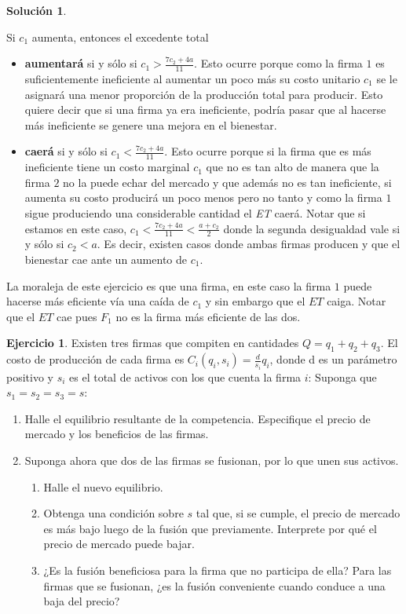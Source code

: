 \documentclass[a4paper, 11pt]{article}
\theoremstyle{definition}
\newtheorem{ejercicio}{Ejercicio}
\newtheorem{solucion}{Soluci\'on}
\begin{document}
\begin{solucion}
\begin{enumerate}[label=(\alph*)]
 Si $c_1$ aumenta, entonces el excedente total  
\begin{itemize}
    \item \textbf{aumentará} si y sólo si $c_1>\frac{7c_2+4a}{11}$. Esto ocurre porque como la firma $1$ es suficientemente ineficiente al aumentar un poco más su costo unitario $c_1$ se le asignará una menor proporción de la producción total para producir. Esto quiere decir que si una firma ya era ineficiente, podría pasar que al hacerse más ineficiente se genere una mejora en el bienestar.
    \item \textbf{caerá }si y sólo si $c_1<\frac{7c_2+4a}{11}$. Esto ocurre porque si la firma que es más ineficiente tiene un costo marginal $c_1$ que no es tan alto de manera que la firma $2$ no la puede echar del mercado y que además no es tan ineficiente, si aumenta su costo producirá un poco menos pero no tanto y como la firma $1$ sigue produciendo una considerable cantidad el \textit{ET} caerá. Notar que si estamos en este caso, $c_1<\frac{7c_2+4a}{11}<\frac{a+c_2}{2}$ donde la segunda desigualdad vale si y sólo si $c_2<a$. Es decir, existen casos donde ambas firmas producen y que el bienestar cae ante un aumento de $c_1$.
 \end{itemize}  
 
 La moraleja de este ejercicio es que una firma, en este caso la firma $1$ puede hacerse más eficiente vía una caída de $c_1$ y sin embargo que el $ET$ caiga. Notar que el $ET$ cae pues $F_1$ no es la firma más eficiente de las dos.
\end{enumerate}
\end{solucion}

\begin{ejercicio} %
 Existen tres firmas que compiten en cantidades $Q = q_1 + q_2 + q_3$. El costo de
producción de cada firma es $C_i(q_i, s_i) = \frac{d}{s_i}q_i$, donde d es un parámetro positivo y $s_i$ es el total de activos con los que cuenta la firma $i$: Suponga que $s_1 = s_2 = s_3 = s$:

\begin{enumerate}
 

\item  Halle el equilibrio resultante de la competencia. Especifique el precio de mercado y los beneficios de las firmas.
\item Suponga ahora que dos de las firmas se fusionan, por lo que unen sus activos.
\begin{enumerate}
\item Halle el nuevo equilibrio.
\item Obtenga una condición sobre $s$ tal que, si se cumple, el precio de mercado es más bajo luego de la fusión que previamente. Interprete por qué el precio de mercado puede bajar.
\item ¿Es la fusión beneficiosa para la firma que no participa de ella?
Para las firmas que se fusionan, ¿es la fusión conveniente cuando conduce a una baja del precio?
\end{enumerate}
\end{enumerate}
\end{ejercicio}
\end{document}
